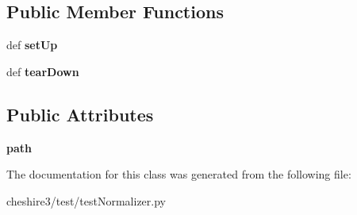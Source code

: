 \subsection*{Public Member Functions}
\begin{DoxyCompactItemize}
\item 
\hypertarget{classcheshire3_1_1test_1_1test_normalizer_1_1_file_assisted_normalizer_test_case_ad46c0e3abba0f7c67eb8aaebb0851cca}{def {\bfseries set\-Up}}\label{classcheshire3_1_1test_1_1test_normalizer_1_1_file_assisted_normalizer_test_case_ad46c0e3abba0f7c67eb8aaebb0851cca}

\item 
\hypertarget{classcheshire3_1_1test_1_1test_normalizer_1_1_file_assisted_normalizer_test_case_a6cbeaa9baf903b33323a67dc58c1e66d}{def {\bfseries tear\-Down}}\label{classcheshire3_1_1test_1_1test_normalizer_1_1_file_assisted_normalizer_test_case_a6cbeaa9baf903b33323a67dc58c1e66d}

\end{DoxyCompactItemize}
\subsection*{Public Attributes}
\begin{DoxyCompactItemize}
\item 
\hypertarget{classcheshire3_1_1test_1_1test_normalizer_1_1_file_assisted_normalizer_test_case_ad74c445128d13769a689079a4e69b6a4}{{\bfseries path}}\label{classcheshire3_1_1test_1_1test_normalizer_1_1_file_assisted_normalizer_test_case_ad74c445128d13769a689079a4e69b6a4}

\end{DoxyCompactItemize}


The documentation for this class was generated from the following file\-:\begin{DoxyCompactItemize}
\item 
cheshire3/test/test\-Normalizer.\-py\end{DoxyCompactItemize}
